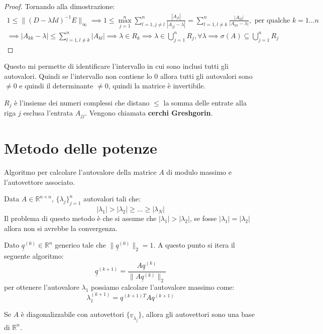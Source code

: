\begin{teorema} 
\begin{proof}
        Tornando alla dimostrazione:
        \begin{equation*}
            \begin{aligned}
                1 \leq \|(D - \lambda Id)^{-1}E\|_\infty \implies 1 \leq \max_{j = 1}^n
                \sum_{l = 1,j \neq l}^{n} \frac{|A_{jl}|}{|A_{jj} - \lambda|} = 
                \sum_{l = 1,l \neq k}^{n} \frac{|A_{kl}|}{|A_{kk} - \lambda|}, 
                \text{ per qualche }k = 1 \dots n \\ \implies |A_{kk} - \lambda| \leq 
                \sum_{l = 1,l \neq k}^{n} |A_{kl}| \implies \lambda \in R_k \implies 
                \lambda \in \bigcup_{j = 1}^n R_j, \forall \lambda \implies 
                \sigma(A) \subseteq \bigcup_{j = 1}^n R_j
            \end{aligned}
        \end{equation*}
    \end{proof}
\end{teorema}
Questo mi permette di identificare l'intervallo in cui sono inclusi tutti gli
autovalori. Quindi se l'intervallo non contiene lo $0$ allora tutti gli autovalori
sono $\neq 0$ e quindi il determinante $\ne 0$, quindi la matrice è invertibile.
\begin{nota}
    $R_j$ è l'insieme dei numeri complessi che distano $\le$ la somma delle entrate
    alla riga $j$ esclusa l'entrata $A_{jj}$. Vengono chiamata \textbf{cerchi Greshgorin}.
\end{nota}
\section{Metodo delle potenze}
Algoritmo per calcolare l'autovalore della matrice $A$ di modulo massimo e 
l'autovettore associato.

Data $A\in \mathbb{R}^{n\times n}$, $\{\lambda_j\}^n_{j = 1}$ autovalori tali che:
\begin{equation*}
    |\lambda_1|> |\lambda_2| \ge \dots \ge |\lambda_N|
\end{equation*}
Il problema di questo metodo è che si assume che $|\lambda_1|> |\lambda_2|$,
se fosse $|\lambda_1| = |\lambda_2|$ allora non si avrebbe la convergenza.

Dato $\underline{q}^{(0)}\in \mathbb{R}^n$ generico tale che $\|\underline{q}^{(0)}\|_2=1$.
A questo punto si itera il seguente algoritmo:
\begin{equation*}
    \underline{q}^{(k+1)} = \frac{A\underline{q}^{(k)}}{\|A\underline{q}^{(k)}\|_2}
\end{equation*}
per ottenere l'autovalore $\lambda_1$ possiamo calcolare l'autovalore massimo come:
\begin{equation*}
    \lambda_1^{(k + 1)} = q^{(k+1)T}Aq^{(k+1)}
\end{equation*}
\begin{nota}
    Se $A$ è diagonalizzabile con autovettori $\{\underline{v}_{\lambda_j}\}$, 
    allora gli autovettori sono una base di $\mathbb{R}^n$.
\end{nota}

